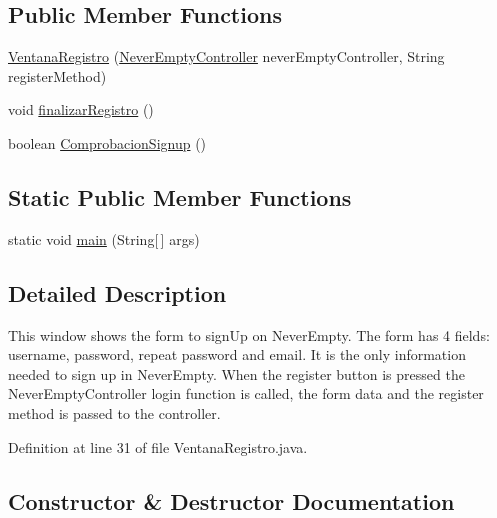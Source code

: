 \subsection*{Public Member Functions}
\begin{DoxyCompactItemize}
\item 
\mbox{\hyperlink{class_s_p_q_1_1gui_1_1_ventana_registro_a40069db92c94222331b181f23744c14f}{Ventana\+Registro}} (\mbox{\hyperlink{class_s_p_q_1_1controller_1_1_never_empty_controller}{Never\+Empty\+Controller}} never\+Empty\+Controller, String register\+Method)
\item 
void \mbox{\hyperlink{class_s_p_q_1_1gui_1_1_ventana_registro_ac33d30ad4e6980a453a3a6c3de20f468}{finalizar\+Registro}} ()
\item 
boolean \mbox{\hyperlink{class_s_p_q_1_1gui_1_1_ventana_registro_a409053f213651ce392699ee8c4f07e66}{Comprobacion\+Signup}} ()
\end{DoxyCompactItemize}
\subsection*{Static Public Member Functions}
\begin{DoxyCompactItemize}
\item 
static void \mbox{\hyperlink{class_s_p_q_1_1gui_1_1_ventana_registro_a8d80a5efba104ecaefab065592e23a68}{main}} (String\mbox{[}$\,$\mbox{]} args)
\end{DoxyCompactItemize}


\subsection{Detailed Description}
This window shows the form to sign\+Up on Never\+Empty. The form has 4 fields\+: username, password, repeat password and email. It is the only information needed to sign up in Never\+Empty. When the register button is pressed the Never\+Empty\+Controller login function is called, the form data and the register method is passed to the controller. 

Definition at line 31 of file Ventana\+Registro.\+java.



\subsection{Constructor \& Destructor Documentation}
\mbox{\label{class_s_p_q_1_1gui_1_1_ventana_registro_a40069db92c94222331b181f23744c14f}} 
